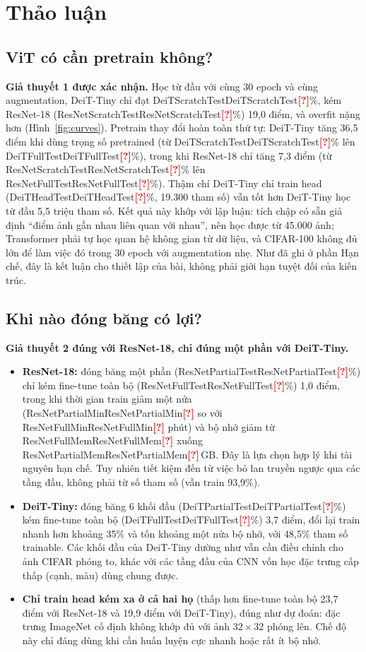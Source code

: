 \documentclass[12pt]{article}
\newcommand{\st}[1]{\textbf{#1}}
\newcommand{\todo}[1]{\textcolor{red}{\textbf{[#1]}}}
\newcommand{\val}[1]{\ifcsname #1\endcsname\csname #1\endcsname\else\todo{?}\fi}
\begin{document}
\section{Thảo luận}\label{sec:discussion}
\subsection{ViT có cần pretrain không?}
\st{Giả thuyết 1 được xác nhận.} Học từ đầu với cùng 30 epoch và cùng augmentation, DeiT-Tiny chỉ đạt
\val{DeiTScratchTest}\%, kém ResNet-18 (\val{ResNetScratchTest}\%) 19,0 điểm, và overfit nặng hơn (Hình~\ref{fig:curves}).
Pretrain thay đổi hoàn toàn thứ tự: DeiT-Tiny tăng 36,5 điểm khi dùng trọng số pretrained (từ \val{DeiTScratchTest}\% lên
\val{DeiTFullTest}\%), trong khi ResNet-18 chỉ tăng 7,3 điểm (từ \val{ResNetScratchTest}\% lên \val{ResNetFullTest}\%).
Thậm chí DeiT-Tiny chỉ train head (\val{DeiTHeadTest}\%, 19.300 tham số) vẫn tốt hơn DeiT-Tiny học từ đầu 5,5 triệu tham số.
Kết quả này khớp với lập luận: tích chập có sẵn giả định ``điểm ảnh gần nhau liên quan với nhau'', nên học được từ
45.000 ảnh; Transformer phải tự học quan hệ không gian từ dữ liệu, và CIFAR-100 không đủ lớn để làm việc đó trong 30
epoch với augmentation nhẹ. Như đã ghi ở phần Hạn chế, đây là kết luận cho thiết lập của bài, không phải giới hạn tuyệt
đối của kiến trúc.

\subsection{Khi nào đóng băng có lợi?}
\st{Giả thuyết 2 đúng với ResNet-18, chỉ đúng một phần với DeiT-Tiny.}
\begin{itemize}
  \item \st{ResNet-18:} đóng băng một phần (\val{ResNetPartialTest}\%) chỉ kém fine-tune toàn bộ (\val{ResNetFullTest}\%)
        1,0 điểm, trong khi thời gian train giảm một nửa (\val{ResNetPartialMin} so với \val{ResNetFullMin} phút) và bộ nhớ
        giảm từ \val{ResNetFullMem} xuống \val{ResNetPartialMem}\,GB. Đây là lựa chọn hợp lý khi tài nguyên hạn chế.
        Tuy nhiên tiết kiệm đến từ việc bỏ lan truyền ngược qua các tầng đầu, không phải từ số tham số (vẫn train 93,9\%).
  \item \st{DeiT-Tiny:} đóng băng 6 khối đầu (\val{DeiTPartialTest}\%) kém fine-tune toàn bộ (\val{DeiTFullTest}\%) 3,7
        điểm, đổi lại train nhanh hơn khoảng 35\% và tốn khoảng một nửa bộ nhớ, với 48,5\% tham số trainable. Các khối đầu
        của DeiT-Tiny dường như vẫn cần điều chỉnh cho ảnh CIFAR phóng to, khác với các tầng đầu của CNN vốn học đặc trưng
        cấp thấp (cạnh, màu) dùng chung được.
  \item \st{Chỉ train head kém xa ở cả hai họ} (thấp hơn fine-tune toàn bộ 23,7 điểm với ResNet-18 và 19,9 điểm với
        DeiT-Tiny), đúng như dự đoán: đặc trưng ImageNet cố định không khớp đủ với ảnh $32\times32$ phóng lên. Chế độ này
        chỉ đáng dùng khi cần huấn luyện cực nhanh hoặc rất ít bộ nhớ.
\end{itemize}
\end{document}
